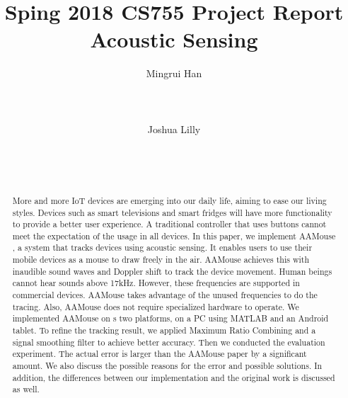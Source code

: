 \documentclass{acm_proc_article-sp}
\begin{document}
\title{Sping 2018 CS755 Project Report Acoustic Sensing}

\author{
\alignauthor
Mingrui Han\\
       \\
       \\
       \\
\alignauthor
Joshua Lilly\\
       \\
       \\
       \\
}

\maketitle
\begin{abstract}
More and more IoT devices are emerging into our daily life, aiming to ease
our living styles. Devices such as smart televisions and smart fridges
will have more functionality to provide a better user experience.
A traditional controller that uses buttons cannot meet the expectation
of the usage in all devices. In this paper, we implement AAMouse \cite{yun:turning}, a system that tracks devices using acoustic sensing. It enables
users to use their mobile devices as a mouse to
draw freely in the air. AAMouse achieves this with inaudible sound waves and Doppler shift to track the device movement. Human beings cannot
hear sounds above 17kHz. However, these frequencies 
are supported in commercial devices. AAMouse takes advantage of the
unused frequencies to do the tracing. Also, AAMouse does not require specialized 
hardware to operate. We implemented AAMouse on   s two platforms, on a PC using MATLAB and an Android tablet. To refine the tracking result, we applied Maximum
Ratio Combining and a signal smoothing filter to achieve better accuracy. Then we conducted the 
evaluation experiment. The actual error is larger than the AAMouse
paper by a significant amount. We also discuss the possible reasons for the error and possible solutions. In 
addition, the differences between our implementation and the 
original work is discussed as well.
\end{abstract}

\end{document}
